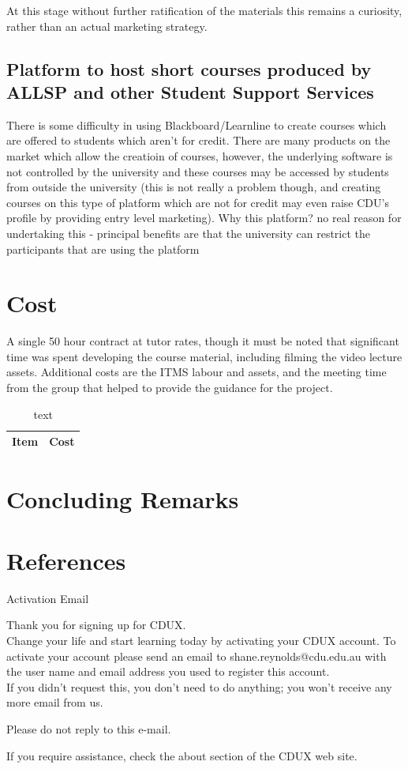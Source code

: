\documentclass[a4paper]{article}
\begin{document}
At this stage without further ratification of the materials this remains a curiosity, rather than an actual marketing strategy.

\subsection{Platform to host short courses produced by ALLSP and other Student Support Services}
There is some difficulty in using Blackboard/Learnline to create courses which are offered to students which aren't for credit. There are many products on the market which allow the creatioin of courses, however, the underlying software is not controlled by the university and these courses may be accessed by students from outside the university (this is not really a problem though, and creating courses on this type of platform which are not for credit may even raise CDU's profile by providing entry level marketing). Why this platform? no real reason for undertaking this - principal benefits are that the university can restrict the participants that are using the platform

\section{Cost}
A single 50 hour contract at tutor rates, though it must be noted that significant time was spent developing the course material, including filming the video lecture assets. Additional costs are the ITMS labour and assets, and the meeting time from the group that helped to provide the guidance for the project.

\begin{table}
\centering
\caption{text}
\begin{tabular}{lr}
\toprule
\textbf{Item} & \textbf{Cost}\\
\midrule
\bottomrule
\end{tabular}
\end{table}

\section{Concluding Remarks}

\section{References}
Activation Email

Thank you for signing up for CDUX.\\

Change your life and start learning today by activating your CDUX account. To activate your account please send an email to shane.reynolds@cdu.edu.au with the user name and email address you used to register this account.\\

If you didn't request this, you don't need to do anything; you won't receive any more email from us. 

Please do not reply to this e-mail.

If you require assistance, check the about section of the CDUX web site.
\end{document}
